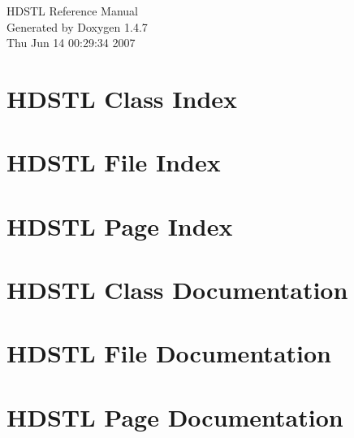 \documentclass[a4paper]{book}
\begin{document}
\begin{titlepage}
\vspace*{7cm}
\begin{center}
{\Large HDSTL Reference Manual}\\
\vspace*{1cm}
{\large Generated by Doxygen 1.4.7}\\
\vspace*{0.5cm}
{\small Thu Jun 14 00:29:34 2007}\\
\end{center}
\end{titlepage}
\clearemptydoublepage
{}
\tableofcontents
\clearemptydoublepage
{}
\chapter{HDSTL Class Index}

\chapter{HDSTL File Index}

\chapter{HDSTL Page Index}

\chapter{HDSTL Class Documentation}


\chapter{HDSTL File Documentation}


















\chapter{HDSTL Page Documentation}















\printindex
\end{document}
